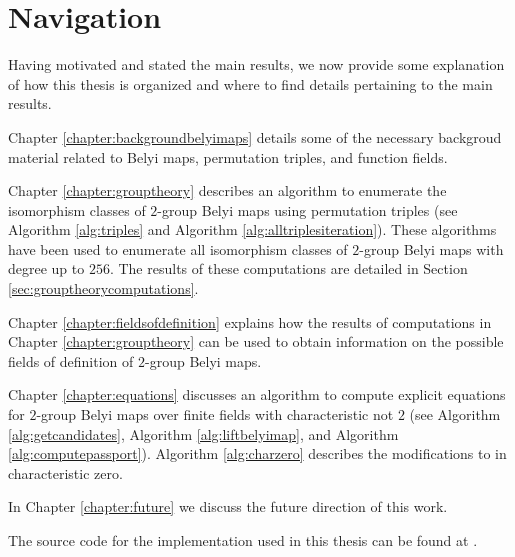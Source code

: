 \documentclass{dcthesis}
\numberwithin{equation}{section}
\theoremstyle{definition}
\theoremstyle{remark}
\begin{document}
{{  \section{Navigation}{\label{sec:navigation}
    Having motivated and stated the main
    results, we now provide
    some explanation of how this thesis is
    organized
    and where to find details pertaining
    to the main results.
    \par
    Chapter \ref{chapter:backgroundbelyimaps}
    details some of the
    necessary backgroud material
    related to Belyi maps,
    permutation triples,
    and function fields.
    \par
    Chapter \ref{chapter:grouptheory}
    describes an algorithm
    to enumerate the
    isomorphism classes
    of $2$-group Belyi maps
    using permutation triples
    (see
    Algorithm \ref{alg:triples}
    and
    Algorithm \ref{alg:alltriplesiteration}).
    These algorithms have been used to
    enumerate all isomorphism classes of
    $2$-group Belyi maps with degree
    up to $256$.
    The results of these computations are
    detailed in
    Section \ref{sec:grouptheorycomputations}.
    \par
    Chapter \ref{chapter:fieldsofdefinition}
    explains how
    the results of
    computations in
    Chapter \ref{chapter:grouptheory}
    can be used to obtain information
    on the possible fields of definition
    of $2$-group Belyi maps.
    \par
    Chapter \ref{chapter:equations}
    discusses an algorithm to
    compute explicit equations
    for $2$-group Belyi maps
    over finite fields with
    characteristic not $2$
    (see
    Algorithm \ref{alg:getcandidates},
    Algorithm \ref{alg:liftbelyimap},
    and
    Algorithm \ref{alg:computepassport}).
    Algorithm \ref{alg:charzero}
    describes the modifications to
    in characteristic zero.
    \par
    In Chapter \ref{chapter:future}
    we discuss the future direction of this work.
    \par
    The source code for the implementation used
    in this thesis can be found at
    \cite{twogroupdessins}.
  }
}}
\end{document}
